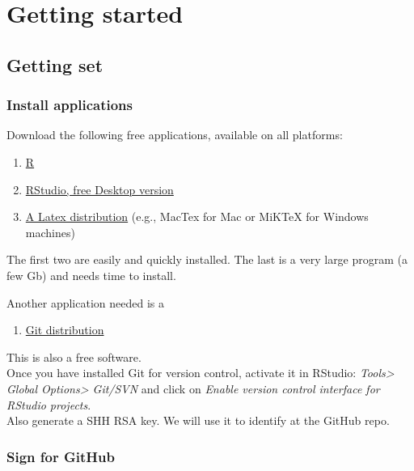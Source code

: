 \documentclass[]{book}
\providecommand{\tightlist}{%
  \setlength{\itemsep}{0pt}\setlength{\parskip}{0pt}}
\theoremstyle{definition}
\theoremstyle{definition}
\theoremstyle{definition}
\theoremstyle{remark}
\begin{document}
\hypertarget{part-getting-started}{%
\part{Getting started}\label{part-getting-started}}

\hypertarget{getset}{%
\chapter{Getting set}\label{getset}}

\hypertarget{install-applications}{%
\section{Install applications}\label{install-applications}}

Download the following free applications, available on all platforms:

\begin{enumerate}
\def\labelenumi{\arabic{enumi}.}
\tightlist
\item
  \href{https://cran.uni-muenster.de/}{R}
\item
  \href{https://www.rstudio.com/products/rstudio/download/\#download}{RStudio,
  free Desktop version}
\item
  \href{https://www.latex-project.org/get/}{A Latex distribution} (e.g.,
  MacTex for Mac or MiKTeX for Windows machines)
\end{enumerate}

The first two are easily and quickly installed. The last is a very large
program (a few Gb) and needs time to install.

Another application needed is a

\begin{enumerate}
\def\labelenumi{\arabic{enumi}.}
\setcounter{enumi}{3}
\tightlist
\item
  \href{https://git-scm.com/downloads}{Git distribution}
\end{enumerate}

This is also a free software.\\
Once you have installed Git for version control, activate it in RStudio:
\emph{Tools\textgreater{} Global Options\textgreater{} Git/SVN} and
click on \emph{Enable version control interface for RStudio projects}.\\
Also generate a SHH RSA key. We will use it to identify at the GitHub
repo.

\hypertarget{sign-for-github}{%
\section{Sign for GitHub}\label{sign-for-github}}
\end{document}
